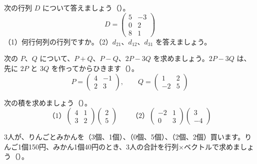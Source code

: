 \bkendproblems
{}

\bkproblem 次の行列 $D$ について答えましょう\mbox{（）}。
\[ D=\begin{pmatrix} 5 & -3\\ 0 & 2\\ 8 & 1 \end{pmatrix} \]
（1）何行何列の行列ですか。\newline（2）$d_{21}$、$d_{12}$、$d_{31}$ を答えましょう。

\bkproblem 次の $P$、$Q$ について、$P+Q$、$P-Q$、$2P-3Q$ を求めましょう。$2P-3Q$ は、先に $2P$ と $3Q$ を作ってからひきます\mbox{（）}。
\[ P=\begin{pmatrix} 4 & -1\\ 2 & 3 \end{pmatrix},\qquad Q=\begin{pmatrix} 1 & 2\\ -2 & 5 \end{pmatrix} \]

\bkproblem 次の積を求めましょう\mbox{（）}。
\[ \text{（1）}\begin{pmatrix} 4 & 1\\ 3 & 2 \end{pmatrix}\begin{pmatrix} 2\\ 5 \end{pmatrix}\qquad \text{（2）}\begin{pmatrix} -2 & 1\\ 0 & 3 \end{pmatrix}\begin{pmatrix} 3\\ -4 \end{pmatrix} \]

\bkproblem 3人が、りんごとみかんを（3個、1個）、（0個、5個）、（2個、2個）買います。りんご1個150円、みかん1個40円のとき、3人の合計を行列×ベクトルで求めましょう\mbox{（）}。

